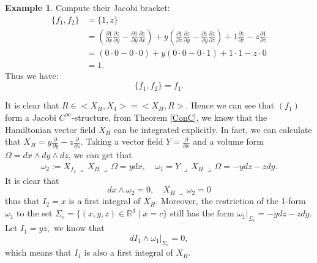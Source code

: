 \documentclass{article}
\theoremstyle{remark}
\theoremstyle{definition}
\newtheorem{example}{Example}[section]
\newcommand{\contract}{\,\lrcorner\,}
\begin{document}
\begin{example}
Compute their Jacobi bracket:
\begin{align*}
\{f_1, f_2\} &= \{1, z\} \\
&= \left(\frac{\partial 1}{\partial x}\frac{\partial z}{\partial y} - \frac{\partial 1}{\partial y}\frac{\partial z}{\partial x}\right) 
+ y\left(\frac{\partial 1}{\partial z}\frac{\partial z}{\partial y} - \frac{\partial 1}{\partial y}\frac{\partial z}{\partial z}\right)
+ 1\frac{\partial z}{\partial z} - z\frac{\partial 1}{\partial z} \\
&= (0\cdot 0 - 0\cdot 0) + y(0\cdot 0 - 0\cdot 1) + 1\cdot 1 - z\cdot 0 \\
&= 1.
\end{align*}
Thus we have:
\[
\{f_1, f_2\} = f_1.
\]


It is clear that $R\in <X_H,X_1>=<X_H,R>$. Hence we can see that $(f_1)$ form a Jacobi $C^\infty$-structure, from Theorem \ref{ConC}, we know that the Hamiltonian vector field $X_{H}$ can be integrated explicitly.
In fact, we can calculate that $X_H=y\frac{\partial}{\partial y}-z\frac{\partial}{\partial z}$. 
Taking a vector field $Y=\frac{\partial}{\partial x}$ and a volume form $\Omega=dx\wedge dy\wedge dz$,  we can get that
\begin{align*}
\omega_2:=X_{f_1}\contract X_H\contract\Omega=ydx,\quad \omega_1=Y\contract X_H\contract\Omega=-ydz-zdy.
\end{align*}
It is clear that 
$$dx\wedge\omega_2=0,\quad X_H\contract\omega_2=0$$
thus that $I_2=x$ is a first integral of $X_H.$ Moreover, the restriction of the 1-form $\omega_1$ to the set $\Sigma_c=\{(x,y,z)\in\mathbb R^3\;|\;x=c\}$ still has the form $\omega_1|_{\Sigma_c}=-ydz-zdy$. Let $I_1=yz,$ we know that 
$$dI_1\wedge\omega_1|_{\Sigma_c}=0, $$
which means that $I_1$ is also a first integral of $X_H.$ 
\end{example}
\end{document}
